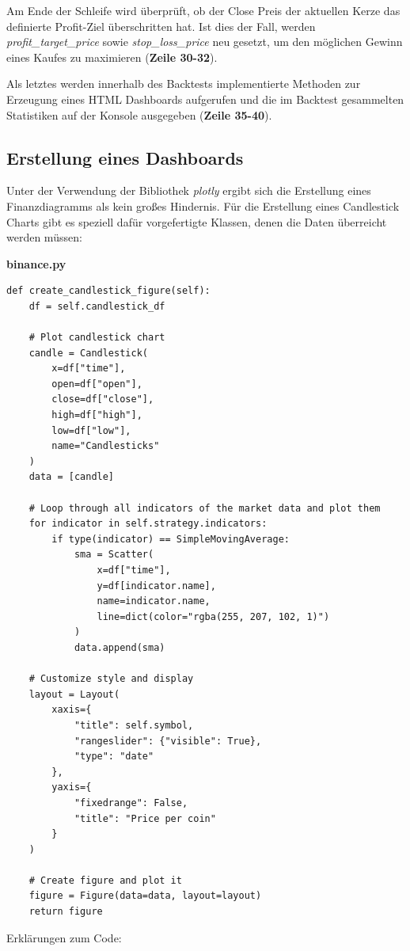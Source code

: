 \documentclass[oneside]{ausarbeitung}
\begin{document}
Am Ende der Schleife wird überprüft, ob der Close Preis der aktuellen Kerze das definierte Profit-Ziel überschritten hat. Ist dies der Fall, werden \textit{profit\_target\_price} sowie \textit{stop\_loss\_price} neu gesetzt, um den möglichen Gewinn eines Kaufes zu maximieren (\textbf{Zeile 30-32}).

Als letztes werden innerhalb des Backtests implementierte Methoden zur Erzeugung eines HTML Dashboards aufgerufen und die im Backtest gesammelten Statistiken auf der Konsole ausgegeben (\textbf{Zeile 35-40}). 

\subsection{Erstellung eines Dashboards}
\label{sub:erstellung_eines_dashboards}

Unter der Verwendung der Bibliothek \textit{plotly} ergibt sich die Erstellung eines Finanzdiagramms als kein großes Hindernis. Für die Erstellung eines Candlestick Charts gibt es speziell dafür vorgefertigte Klassen, denen die Daten überreicht werden müssen:

\lstset{language=Python}
\lstset{frame=lines}
\lstset{basicstyle=\footnotesize}
\textbf{binance.py}
\begin{lstlisting}
def create_candlestick_figure(self):
	df = self.candlestick_df
	
	# Plot candlestick chart
	candle = Candlestick(
		x=df["time"],
		open=df["open"],
		close=df["close"],
		high=df["high"],
		low=df["low"],
		name="Candlesticks"
	)
	data = [candle]
	
	# Loop through all indicators of the market data and plot them
	for indicator in self.strategy.indicators:
		if type(indicator) == SimpleMovingAverage:
			sma = Scatter(
				x=df["time"],
				y=df[indicator.name],
				name=indicator.name,
				line=dict(color="rgba(255, 207, 102, 1)")
			)
			data.append(sma)
			
	# Customize style and display
	layout = Layout(
		xaxis={
			"title": self.symbol,
			"rangeslider": {"visible": True},
			"type": "date"
		},
		yaxis={
			"fixedrange": False,
			"title": "Price per coin"
		}
	)
	
	# Create figure and plot it
	figure = Figure(data=data, layout=layout)
	return figure
\end{lstlisting}

Erklärungen zum Code:
\end{document}
